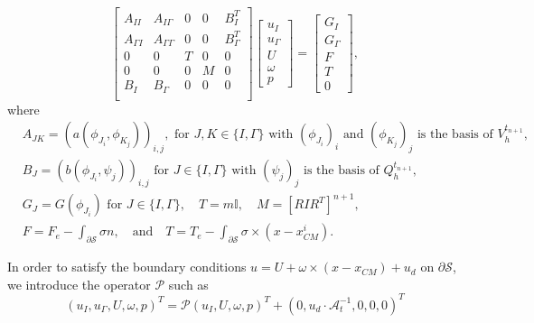 \documentclass[graybox]{svmult}
\newcommand{\Vel}{u} %
\newcommand{\Pres}{p} %
\newcommand{\tvel}{U} %
\newcommand{\angvel}{\omega} %
\newcommand{\CenterMassi}{x_{CM}^i}
\newcommand{\Solid}{\mathcal{S}} %
\newcommand{\normal}{n} %
\begin{document}
\begin{equation}
	\begin{bmatrix}
		A_{II} & A_{I\Gamma} & 0 & 0 & B_{I}^T  \\
		A_{\Gamma I} & A_{\Gamma \Gamma}  & 0 & 0 & B_{\Gamma}^T\\
		0 & 0 & T
		& 0 & 0 \\
		0 & 0 & 0& M
		& 0\\
		B_I & B_\Gamma & 0 & 0 & 0   \\
	\end{bmatrix}
	\begin{bmatrix}
		\Vel_I \\ \Vel_\Gamma \\ \tvel \\ \angvel \\ \Pres 
	\end{bmatrix} 
	= 
	\begin{bmatrix}
		G_I \\
		G_{\Gamma}\\
		F
		\\
		T
		\\
		0
	\end{bmatrix},
	\label{Eq:flu-rig-block}
\end{equation} 
\color{blue}
where
\begin{align*}
&A_{JK} =	(a(\phi_{J_{i}},\phi_{K_{j}}))_{i,j},   \textrm{ for } J,K \in \{I,\Gamma\}  \textrm{ with $(\phi_{J_{i}})_i$ and $( \phi_{K_{j}} )_j$ is the basis of $V_h^{t_{n+1}}$},\\
&B_J = (b(\phi_{J_{i}},\psi_{j}))_{i,j} \textrm{ for } J \in \{I,\Gamma\} \textrm{ with $(\psi_j)_j$ is the basis of $Q_h^{t_{n+1}}$},\\
&G_J = G(\phi_{J_{i}}) \textrm{ for } J \in \{I,\Gamma\}, \quad T = m\mathbb{I}, \quad M = [RIR^T]^{n+1},\\
&F = F_e - \int_{\partial \Solid} \sigma \normal, \quad \textrm{and} \quad T = T_e -\int_{\partial \Solid} \sigma \times (x-\CenterMassi).
\end{align*}



In order to satisfy the boundary conditions $\Vel = \tvel+ \angvel \times (x-x_{CM}) + u_d$ on  $\partial \Solid$, we introduce the operator $\mathcal{P}$ such as 
\begin{equation}
\label{eq:boundary_constraint}
 (\Vel_I,\Vel_\Gamma,\tvel,\angvel,p)^T = \mathcal{P}	(\Vel_I,\tvel,\angvel,p)^T + (0,u_d\cdot\mathcal{A}_t^{-1},0,0,0)^T 
\end{equation}
\end{document}
